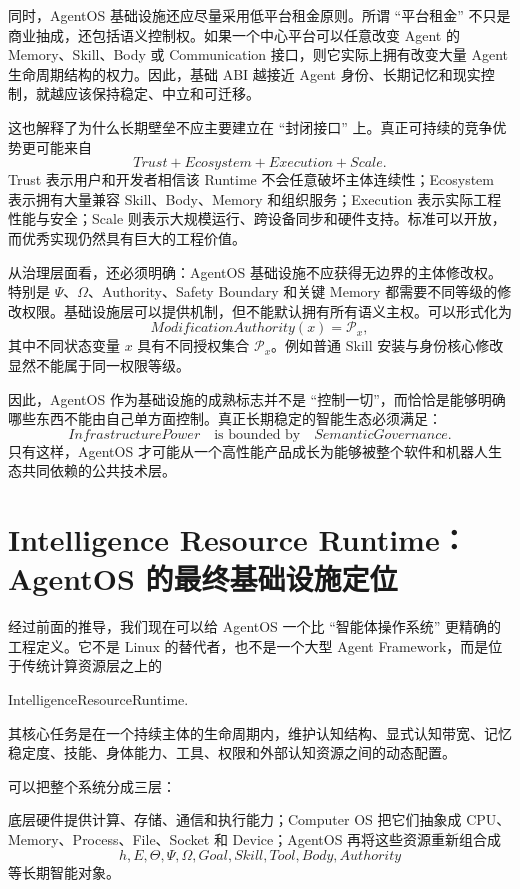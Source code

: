 同时，AgentOS 基础设施还应尽量采用低平台租金原则。所谓 ``平台租金'' 不只是商业抽成，还包括语义控制权。如果一个中心平台可以任意改变 Agent 的 Memory、Skill、Body 或 Communication 接口，则它实际上拥有改变大量 Agent 生命周期结构的权力。因此，基础 ABI 越接近 Agent 身份、长期记忆和现实控制，就越应该保持稳定、中立和可迁移。

这也解释了为什么长期壁垒不应主要建立在 ``封闭接口'' 上。真正可持续的竞争优势更可能来自
\[
\boxed{
Trust+Ecosystem+Execution+Scale.
}
\]
Trust 表示用户和开发者相信该 Runtime 不会任意破坏主体连续性；Ecosystem 表示拥有大量兼容 Skill、Body、Memory 和组织服务；Execution 表示实际工程性能与安全；Scale 则表示大规模运行、跨设备同步和硬件支持。标准可以开放，而优秀实现仍然具有巨大的工程价值。

从治理层面看，还必须明确：AgentOS 基础设施不应获得无边界的主体修改权。特别是 $\Psi$、$\Omega$、Authority、Safety Boundary 和关键 Memory 都需要不同等级的修改权限。基础设施层可以提供机制，但不能默认拥有所有语义主权。可以形式化为
\[
ModificationAuthority(x)
=
\mathcal P_x,
\]
其中不同状态变量 $x$ 具有不同授权集合 $\mathcal P_x$。例如普通 Skill 安装与身份核心修改显然不能属于同一权限等级。

因此，AgentOS 作为基础设施的成熟标志并不是 ``控制一切''，而恰恰是能够明确哪些东西不能由自己单方面控制。真正长期稳定的智能生态必须满足：
\[
\boxed{
InfrastructurePower
\quad\text{is bounded by}\quad
SemanticGovernance.
}
\]
只有这样，AgentOS 才可能从一个高性能产品成长为能够被整个软件和机器人生态共同依赖的公共技术层。

\section{Intelligence Resource Runtime：AgentOS 的最终基础设施定位}

经过前面的推导，我们现在可以给 AgentOS 一个比 ``智能体操作系统'' 更精确的工程定义。它不是 Linux 的替代者，也不是一个大型 Agent Framework，而是位于传统计算资源层之上的
\begin{statementbox}
IntelligenceResourceRuntime.
\end{statementbox}
其核心任务是在一个持续主体的生命周期内，维护认知结构、显式认知带宽、记忆稳定度、技能、身体能力、工具、权限和外部认知资源之间的动态配置。

可以把整个系统分成三层：
\begin{statementbox}
\centering
{}
\end{statementbox}
底层硬件提供计算、存储、通信和执行能力；Computer OS 把它们抽象成 CPU、Memory、Process、File、Socket 和 Device；AgentOS 再将这些资源重新组合成
\[
h,E,\Theta,\Psi,\Omega,
Goal,Skill,Tool,Body,Authority
\]
等长期智能对象。

